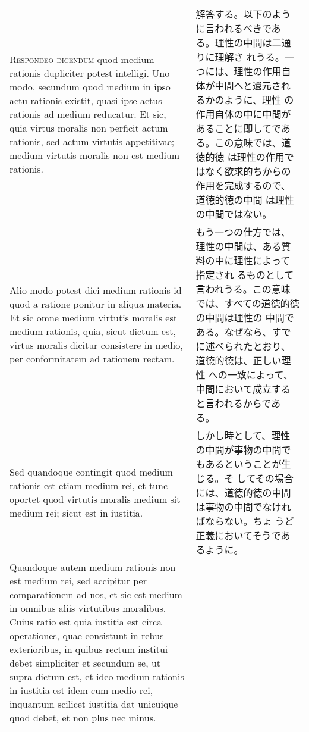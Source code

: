 \documentclass[10pt]{jsarticle}
\begin{document}
\begin{longtable}{p{21em}p{21em}}
 {\scshape Respondeo dicendum} quod medium rationis dupliciter potest
 intelligi. Uno modo, secundum quod medium in ipso actu rationis
 existit, quasi ipse actus rationis ad medium reducatur. Et sic, quia
 virtus moralis non perficit actum rationis, sed actum virtutis
 appetitivae; medium virtutis moralis non est medium rationis.


&

 解答する。以下のように言われるべきである。理性の中間は二通りに理解さ
 れうる。一つには、理性の作用自体が中間へと還元されるかのように、理性
 の作用自体の中に中間があることに即してである。この意味では、道徳的徳
 は理性の作用ではなく欲求的ちからの作用を完成するので、道徳的徳の中間
 は理性の中間ではない。

\\

 Alio modo potest dici medium rationis id quod a ratione ponitur in
 aliqua materia. Et sic omne medium virtutis moralis est medium
 rationis, quia, sicut dictum est, virtus moralis dicitur consistere
 in medio, per conformitatem ad rationem rectam.


&

もう一つの仕方では、理性の中間は、ある質料の中に理性によって指定され
 るものとして言われうる。この意味では、すべての道徳的徳の中間は理性の
 中間である。なぜなら、すでに述べられたとおり、道徳的徳は、正しい理性
 への一致によって、中間において成立すると言われるからである。
 
\\



 Sed quandoque contingit quod medium rationis est etiam medium rei, et
 tunc oportet quod virtutis moralis medium sit medium rei; sicut est
 in iustitia.


&

 しかし時として、理性の中間が事物の中間でもあるということが生じる。そ
 してその場合には、道徳的徳の中間は事物の中間でなければならない。ちょ
 うど正義においてそうであるように。

\\

 Quandoque autem medium rationis non est medium rei, sed accipitur per
 comparationem ad nos, et sic est medium in omnibus aliis virtutibus
 moralibus. Cuius ratio est quia iustitia est circa operationes, quae
 consistunt in rebus exterioribus, in quibus rectum institui debet
 simpliciter et secundum se, ut supra dictum est, et ideo medium
 rationis in iustitia est idem cum medio rei, inquantum scilicet
 iustitia dat unicuique quod debet, et non plus nec minus.


\end{longtable}
\end{document}
